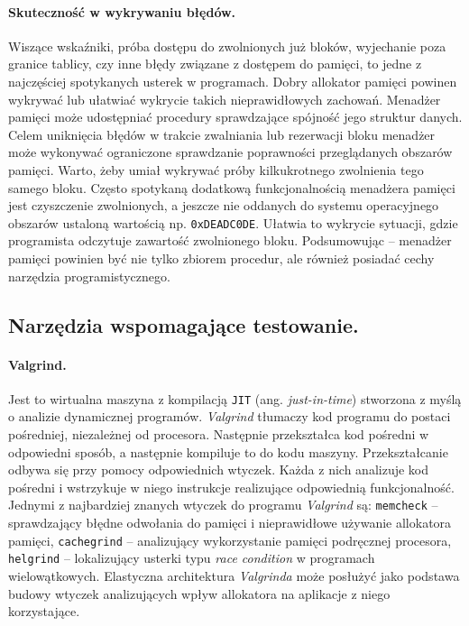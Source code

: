 \documentclass[12pt,a4paper,titlepage,twoside]{mwart}
\begin{document}
\paragraph{Skuteczność w wykrywaniu błędów.} Wiszące wskaźniki, próba dostępu
do zwolnionych już bloków, wyjechanie poza granice tablicy, czy inne błędy
związane z dostępem do pamięci, to jedne z najczęściej spotykanych usterek w
programach. Dobry allokator pamięci powinen wykrywać lub ułatwiać wykrycie
takich nieprawidłowych zachowań. Menadżer pamięci może udostępniać procedury
sprawdzające spójność jego struktur danych. Celem uniknięcia błędów w trakcie
zwalniania lub rezerwacji bloku menadżer może wykonywać ograniczone sprawdzanie
poprawności przeglądanych obszarów pamięci. Warto, żeby umiał wykrywać próby
kilkukrotnego zwolnienia tego samego bloku. Często spotykaną dodatkową
funkcjonalnością menadżera pamięci jest czyszczenie zwolnionych, a jeszcze nie
oddanych do systemu operacyjnego obszarów ustaloną wartością np.
\verb+0xDEADC0DE+. Ułatwia to wykrycie sytuacji, gdzie programista odczytuje
zawartość zwolnionego bloku. Podsumowując -- menadżer pamięci powinien być nie
tylko zbiorem procedur, ale również posiadać cechy narzędzia programistycznego.

\subsection{Narzędzia wspomagające testowanie.}

\paragraph{Valgrind.} Jest to wirtualna maszyna z kompilacją \texttt{JIT} (ang.
\textit{just-in-time}) stworzona z myślą o analizie dynamicznej programów.
\textit{Valgrind} tłumaczy kod programu do postaci pośredniej, niezależnej od
procesora. Następnie przekształca kod pośredni w odpowiedni sposób, a następnie
kompiluje to do kodu maszyny. Przekształcanie odbywa się przy pomocy
odpowiednich wtyczek. Każda z nich analizuje kod pośredni i wstrzykuje w niego
instrukcje realizujące odpowiednią funkcjonalność. Jednymi z najbardziej
znanych wtyczek do programu \textit{Valgrind} są: \texttt{memcheck} --
sprawdzający błędne odwołania do pamięci i nieprawidłowe używanie allokatora
pamięci, \texttt{cachegrind} -- analizujący wykorzystanie pamięci podręcznej
procesora, \texttt{helgrind} -- lokalizujący usterki typu \textit{race
condition} w programach wielowątkowych. Elastyczna architektura
\textit{Valgrinda} może posłużyć jako podstawa budowy wtyczek analizujących
wpływ allokatora na aplikacje z niego korzystające.
\end{document}
